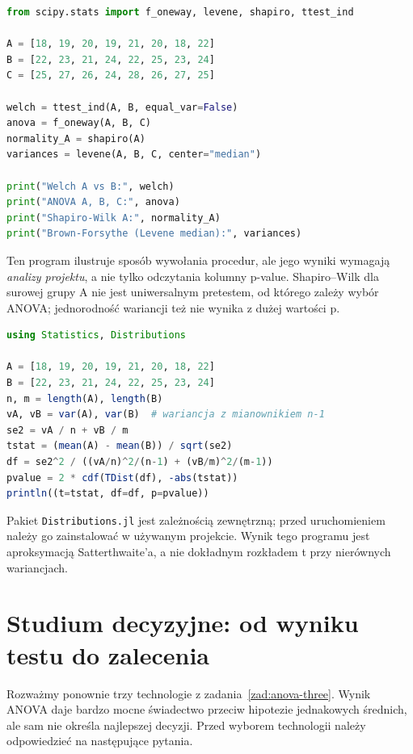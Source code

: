 \begin{lstlisting}[language=Python,caption={Kompletny przykład: Welch, ANOVA i diagnostyka w Pythonie (SciPy).}]
from scipy.stats import f_oneway, levene, shapiro, ttest_ind

A = [18, 19, 20, 19, 21, 20, 18, 22]
B = [22, 23, 21, 24, 22, 25, 23, 24]
C = [25, 27, 26, 24, 28, 26, 27, 25]

welch = ttest_ind(A, B, equal_var=False)
anova = f_oneway(A, B, C)
normality_A = shapiro(A)
variances = levene(A, B, C, center="median")

print("Welch A vs B:", welch)
print("ANOVA A, B, C:", anova)
print("Shapiro-Wilk A:", normality_A)
print("Brown-Forsythe (Levene median):", variances)
\end{lstlisting}

Ten program ilustruje sposób wywołania procedur, ale jego
wyniki wymagają \emph{analizy projektu}, a nie tylko odczytania
kolumny p-value. Shapiro--Wilk dla surowej grupy A nie jest
uniwersalnym pretestem, od którego zależy wybór ANOVA;
jednorodność wariancji też nie wynika z dużej wartości p.

\begin{lstlisting}[language=Julia,caption={Porównanie grup metodą Welcha w Julii: obliczenie statystyki i p-value.}]
using Statistics, Distributions

A = [18, 19, 20, 19, 21, 20, 18, 22]
B = [22, 23, 21, 24, 22, 25, 23, 24]
n, m = length(A), length(B)
vA, vB = var(A), var(B)  # wariancja z mianownikiem n-1
se2 = vA / n + vB / m
tstat = (mean(A) - mean(B)) / sqrt(se2)
df = se2^2 / ((vA/n)^2/(n-1) + (vB/m)^2/(m-1))
pvalue = 2 * cdf(TDist(df), -abs(tstat))
println((t=tstat, df=df, p=pvalue))
\end{lstlisting}

Pakiet \texttt{Distributions.jl} jest zależnością zewnętrzną;
przed uruchomieniem należy go zainstalować w używanym projekcie.
Wynik tego programu jest aproksymacją Satterthwaite'a,
a nie dokładnym rozkładem t przy nierównych wariancjach.

\section{Studium decyzyjne: od wyniku testu do zalecenia}
Rozważmy ponownie trzy technologie z zadania~\ref{zad:anova-three}.
Wynik ANOVA daje bardzo mocne świadectwo przeciw hipotezie
jednakowych średnich, ale sam nie określa najlepszej decyzji.
Przed wyborem technologii należy odpowiedzieć na następujące
pytania.

